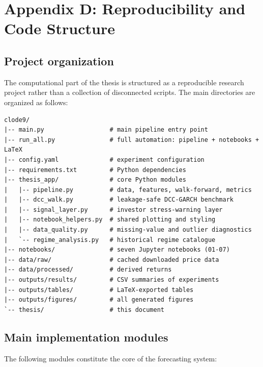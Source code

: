 \section{Appendix D: Reproducibility and Code Structure}

\subsection{Project organization}

The computational part of the thesis is structured as a reproducible research project rather than a collection of disconnected scripts. The main directories are organized as follows:

\begin{lstlisting}[language={}, caption={Top-level project directory structure.}, label=lst:dirstructure]
clode9/
|-- main.py                  # main pipeline entry point
|-- run_all.py               # full automation: pipeline + notebooks + LaTeX
|-- config.yaml              # experiment configuration
|-- requirements.txt         # Python dependencies
|-- thesis_app/              # core Python modules
|   |-- pipeline.py          # data, features, walk-forward, metrics
|   |-- dcc_walk.py          # leakage-safe DCC-GARCH benchmark
|   |-- signal_layer.py      # investor stress-warning layer
|   |-- notebook_helpers.py  # shared plotting and styling
|   |-- data_quality.py      # missing-value and outlier diagnostics
|   `-- regime_analysis.py   # historical regime catalogue
|-- notebooks/               # seven Jupyter notebooks (01-07)
|-- data/raw/                # cached downloaded price data
|-- data/processed/          # derived returns
|-- outputs/results/         # CSV summaries of experiments
|-- outputs/tables/          # LaTeX-exported tables
|-- outputs/figures/         # all generated figures
`-- thesis/                  # this document
\end{lstlisting}

\subsection{Main implementation modules}

The following modules constitute the core of the forecasting system:

